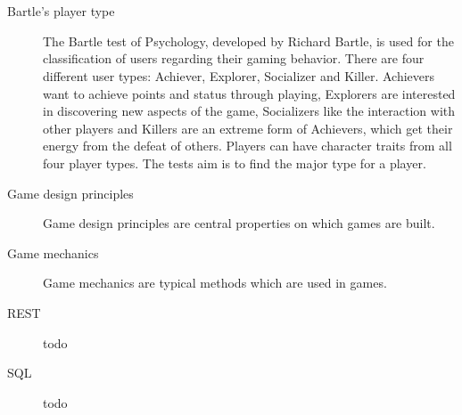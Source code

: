 \chapter*{\nameofglossary}


\begin{description}
	\item[Bartle's player type] The Bartle test of Psychology, developed by Richard Bartle, is used for the classification of users regarding their gaming behavior. There are four different user types: Achiever, Explorer, Socializer and Killer. Achievers want to achieve points and status through playing, Explorers are interested in discovering new aspects of the game, Socializers like the interaction with other players and Killers are an extreme form of Achievers, which get their energy from the defeat of others. Players can have character traits from all four player types. The tests aim is to find the major type for a player. \cite[p. 44, 45]{kumarGamificationWorkDesigning2013}
\end{description}

\begin{description}
	\item[Game design principles] Game design principles are central properties on which games are built. \cite[p. 8]{kumarGamificationWorkDesigning2013}
\end{description}

\begin{description}
	\item[Game mechanics] Game mechanics are typical methods which are used in games. \cite[p. 8]{kumarGamificationWorkDesigning2013}
	\item[REST] todo
	\item[SQL] todo

\end{description}

